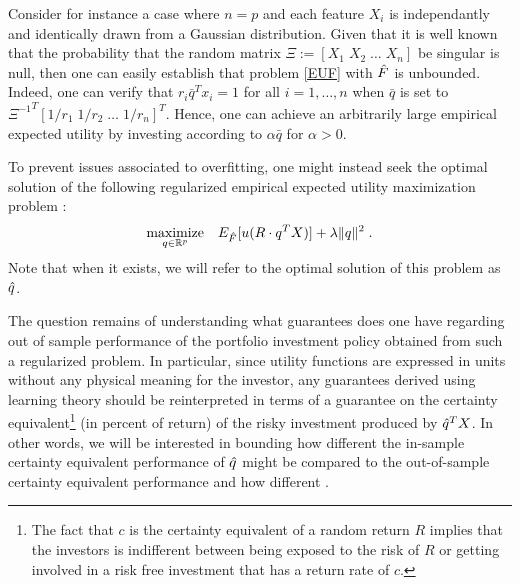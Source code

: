 \begin{ex}
  Consider for instance a case where $n=p$ and each feature $X_i$ is independantly and
  identically drawn from a Gaussian distribution. Given that it is well known that the
  probability that the random matrix $\Xi := [X_1\;X_2\;\dots\;X_n]$ be singular is null,
  then one can easily establish that problem \eqref{EUF} with ${\hat{F}}$ is
  unbounded. Indeed, one can verify that $r_i \bar{q}^T x_i = 1$ for all $i=1,\dots,n$
  when $\bar{q}$ is set to ${\Xi^{-1}}^T [1/r_1\;1/r_2\;\dots\;1/r_n]^T$. Hence, one can
  achieve an arbitrarily large empirical expected utility by investing according to
  $\alpha\bar{q}$ for $\alpha>0$.
\end{ex}

To prevent issues associated to overfitting, one might instead seek the optimal solution
of the following regularized empirical expected utility maximization problem :
\begin{equation}
\operatorname*{maximize}_{q\in\mathbb{R}^p}\;\;\;E_{\hat{F}}[u(R\cdot q^TX)]+\lambda\|q\|^2\;.\label{EUFhatReg}
\end{equation}
Note that when it exists, we will refer to the optimal solution of this problem as ${\hat{q}}$.

The question remains of understanding what guarantees does one have regarding out of
sample performance of the portfolio investment policy obtained from such a regularized
problem. In particular, since utility functions are expressed in units without any
physical meaning for the investor, any guarantees derived using learning theory should be
reinterpreted in terms of a guarantee on the certainty equivalent\footnote{The fact that
  $c$ is the certainty equivalent of a random return $R$ implies that the investors is
  indifferent between being exposed to the risk of $R$ or getting involved in a risk free
  investment that has a return rate of $c$.} (in percent of return) of the risky
investment produced by ${\hat{q}}^T X$. In other words, we will be interested in bounding how
different the in-sample certainty equivalent performance of ${\hat{q}}$ might be compared to
the out-of-sample certainty equivalent performance and how different .







